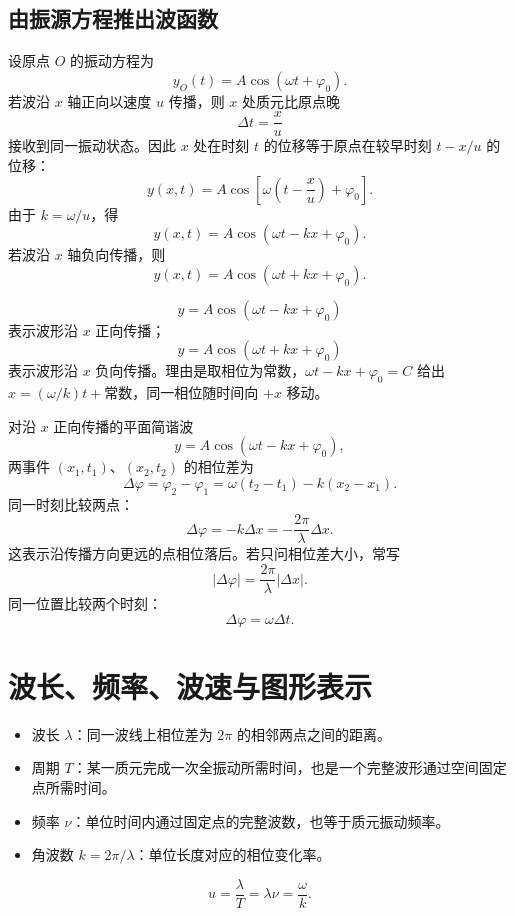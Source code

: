 \subsection*{由振源方程推出波函数}

设原点 $O$ 的振动方程为
\[
  y_O(t)=A\cos(\omega t+\varphi_0).
\]
若波沿 $x$ 轴正向以速度 $u$ 传播，则 $x$ 处质元比原点晚
\[
  \Delta t=\frac{x}{u}
\]
接收到同一振动状态。因此 $x$ 处在时刻 $t$ 的位移等于原点在较早时刻 $t-x/u$ 的位移：
\[
  y(x,t)=A\cos\left[\omega\left(t-\frac{x}{u}\right)+\varphi_0\right].
\]
由于 $k=\omega/u$，得
\[
  y(x,t)=A\cos(\omega t-kx+\varphi_0).
\]
若波沿 $x$ 轴负向传播，则
\[
  y(x,t)=A\cos(\omega t+kx+\varphi_0).
\]

\begin{method}[判断波函数中的正负号]
\[
  y=A\cos(\omega t-kx+\varphi_0)
\]
表示波形沿 $x$ 正向传播；
\[
  y=A\cos(\omega t+kx+\varphi_0)
\]
表示波形沿 $x$ 负向传播。理由是取相位为常数，$\omega t-kx+\varphi_0=C$ 给出 $x=(\omega/k)t+\text{常数}$，同一相位随时间向 $+x$ 移动。
\end{method}

\begin{method}[相位差的直接计算]
对沿 $x$ 正向传播的平面简谐波
\[
  y=A\cos(\omega t-kx+\varphi_0),
\]
两事件 $(x_1,t_1)$、$(x_2,t_2)$ 的相位差为
\[
  \Delta\varphi
  =\varphi_2-\varphi_1
  =\omega(t_2-t_1)-k(x_2-x_1).
\]
同一时刻比较两点：
\[
  \Delta\varphi=-k\Delta x=-\frac{2\pi}{\lambda}\Delta x.
\]
这表示沿传播方向更远的点相位落后。若只问相位差大小，常写
\[
  |\Delta\varphi|=\frac{2\pi}{\lambda}|\Delta x|.
\]
同一位置比较两个时刻：
\[
  \Delta\varphi=\omega\Delta t.
\]
\end{method}

\section{波长、频率、波速与图形表示}

\begin{definition}[波长、周期、频率和角波数]\label{def:wave-parameters}
\begin{itemize}
  \item 波长 $\lambda$：同一波线上相位差为 $2\pi$ 的相邻两点之间的距离。
  \item 周期 $T$：某一质元完成一次全振动所需时间，也是一个完整波形通过空间固定点所需时间。
  \item 频率 $\nu$：单位时间内通过固定点的完整波数，也等于质元振动频率。
  \item 角波数 $k=2\pi/\lambda$：单位长度对应的相位变化率。
\end{itemize}
\[
  u=\frac{\lambda}{T}=\lambda\nu=\frac{\omega}{k}.
\]
\end{definition}

